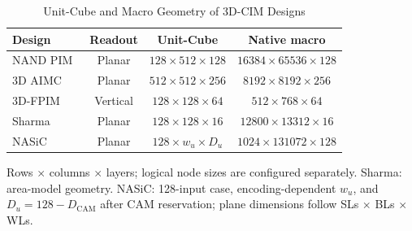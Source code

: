 \begin{table}[t]
  \caption{Unit-Cube and Macro Geometry of 3D-CIM Designs}
  \label{tab:hardware-prototypes}
  \centering
  \begingroup
  \fontsize{9}{10.8}\selectfont
  \setlength{\tabcolsep}{1.5pt}
  \setlength{\parindent}{0pt}
  \renewcommand{\arraystretch}{1.12}
  \begin{tabular*}{\columnwidth}{@{\extracolsep{\fill}}lccc@{}}
    \hline
    \textbf{Design} &
    \textbf{Readout} &
    \textbf{Unit-Cube} &
    \textbf{Native macro} \\
    \hline
    NAND PIM~\cite{jang2025} &
    Planar &
    $128\times512\times128$ &
    $16384\times65536\times128$ \\[2pt]
    3D AIMC~\cite{buchel2025} &
    Planar &
    $512\times512\times256$ &
    $8192\times8192\times256$ \\[2pt]
    3D-FPIM~\cite{lee2022} &
    Vertical &
    $128\times128\times64$ &
    $512\times768\times64$ \\[2pt]
    Sharma~\cite{sharma2025} &
    Planar &
    $128\times128\times16$ &
    $12800\times13312\times16$ \\[2pt]
    NASiC~\cite{nasic2026} &
    Planar &
    $128\times w_u\times D_u$ &
    $1024\times131072\times128$ \\
    \hline
  \end{tabular*}
  \par\smallskip
  \raggedright
  \footnotesize
  Rows $\times$ columns $\times$ layers; logical node sizes are configured separately. Sharma: area-model geometry. NASiC: 128-input case, encoding-dependent $w_u$, and $D_u=128-D_{\mathrm{CAM}}$ after CAM reservation; plane dimensions follow SLs $\times$ BLs $\times$ WLs.
  \par
  \endgroup
\end{table}
